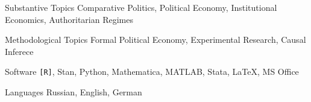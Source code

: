 

\begin{cvskills}

\cvskill
    {Substantive Topics} %
    {Comparative Politics, Political Economy, Institutional Economics, Authoritarian Regimes}

\cvskill
    {Methodological Topics} %
    {Formal Political Economy, Experimental Research, Causal Inferece}

  \cvskill
    {Software} %
    {\texttt{[R]}, Stan, Python, Mathematica, MATLAB, Stata, \LaTeX, MS Office} %


  \cvskill
    {Languages} %
    {Russian, English, German} %

\end{cvskills}
